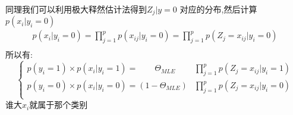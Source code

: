 \documentclass[withoutpreface,bwprint]{cumcmthesis} %
\begin{document}
	同理我们可以利用极大释然估计法得到$Z_j|y=0$ 对应的分布,然后计算$p(x_i|y_i=0)$
		\begin{equation}
		\begin{aligned}
			p(x_i|y_i=0)=\prod \limits_{j=1}^p p(x_{ij}|y_i=0)=\prod \limits_{j=1}^p p(Z_j=x_{ij}|y_i=0)\\
		\end{aligned}
	\end{equation}	
	所以有:
	\begin{equation}
		\begin{cases}
			p(y_i=1) \times p(x_i|y_i=1)=\quad \quad \Theta_{MLE} & \prod \limits_{j=1}^p p(Z_j=x_{ij}|y_i=1)\\
			p(y_i=0) \times p(x_i|y_i=0)=(1-\Theta_{MLE}) & \prod \limits_{j=1}^p p(Z_j=x_{ij}|y_i=0)\\
		\end{cases}
	\end{equation}
	谁大$x_i$就属于那个类别

	

	
	
	


	
	

	
	


	
	



	
	 

	
	
	


	
	
	


	
	
	
	
	
\end{document}

